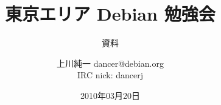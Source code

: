 




\documentclass[cjk,dvipdfmx,12pt]{beamer}
\usepackage{monthlypresentation}


\title{東京エリア Debian 勉強会}
\subtitle{資料}
\author{上川純一 dancer@debian.org\\IRC nick: dancerj}
\date{2010年03月20日}



